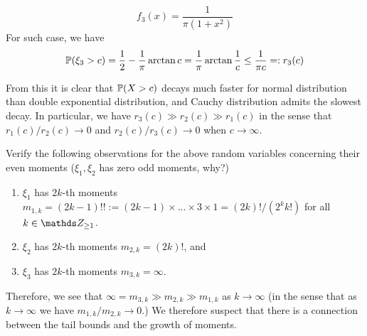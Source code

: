 {\begin{example}
\begin{enumerate}
    \begin{equation*}
        f_3(x) = \frac{1}{\pi (1+x^2)}
    \end{equation*}
    For such case, we have
    \begin{align*}
        \mathbb{P}(\xi_3 > c) = \frac{1}{2} - \frac{1}{\pi} \arctan{c} = \frac{1}{\pi} \arctan{\frac{1}{c}} \leq \frac{1}{\pi c} =: r_3(c)
    \end{align*}
\end{enumerate}
From this it is clear that $\mathbb{P}(X > c)$ decays much faster for normal distribution than double exponential distribution, and Cauchy distribution admits the slowest decay. In particular, we have $r_3(c) \gg r_2(c) \gg r_1(c)$ in the sense that $r_1(c)/r_2(c) \to 0$ and $r_2(c)/r_3(c) \to 0$ when $c \to \infty$.\\
\end{example}

\begin{exercise} Verify the following observations for the above random variables concerning their even moments ($\xi_1, \xi_2$ has zero odd moments, why?)
\begin{enumerate}
    \item $\xi_1$ has $2k$-th moments $m_{1,k} = (2k-1)!! := (2k-1) \times ... \times 3 \times 1 = (2k)!/(2^k k!)$ for all $k \in \Z_{\geq 1}$.
    \item $\xi_2$ has $2k$-th moments $m_{2,k} = (2k)!$, and
    \item $\xi_3$ has $2k$-th moments $m_{3,k} = \infty$.
\end{enumerate}

Therefore, we see that $\infty = m_{3,k} \gg m_{2,k} \gg m_{1,k}$ as $k \to \infty$ (in the sense that as $k \to \infty$ we have $m_{1,k}/m_{2,k} \to 0$.) We therefore suspect that there is a connection between the tail bounds and the growth of moments. 
\end{exercise}}

